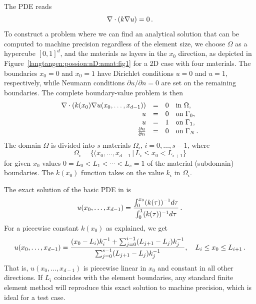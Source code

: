 The PDE reads
\begin{equation} \label{langtangen:poisson:2D:varcoeff2}
    \nabla\cdot (k\nabla u) =0 \thinspace .
\end{equation}
To construct a problem where we can find an analytical solution that can
be computed to machine precision regardless of the element size,
we choose $\Omega$ as a hypercube $[0,1]^d$, and the materials as
layers in the $x_0$ direction, as depicted in
Figure~\ref{langtangen:possion:nD:nmat:fig1} for a 2D case with four materials.
The boundaries $x_0=0$ and $x_0=1$ have Dirichlet conditions
$u=0$ and $u=1$, respectively, while Neumann conditions
$\partial u/\partial n=0$ are set on the remaining boundaries.
The complete boundary-value problem is then
\begin{equation} \label{langtangen:poisson:2D:varcoeff3}
  \begin{array}{rcll}
    \nabla\cdot \left(k(x_0)\nabla u(x_0,\ldots,x_{d-1})\right)
      &=& 0 &\mbox{in } \Omega, \\
    u &=& 0 &\mbox{on } \Gamma_0,\\
    u &=& 1 &\mbox{on } \Gamma_1,\\
    {\partial u\over\partial n} &=& 0 &\mbox{on } \Gamma_N\thinspace .
  \end{array}
\end{equation}
The domain $\Omega$ is divided into $s$ materials $\Omega_i$, $i=0,\ldots,s-1$,
where
\[ \Omega_i = \{ (x_0,\ldots,x_{d-1}\, |\, L_i \leq x_0 < L_{i+1}\} \]
for given $x_0$ values $0=L_0<L_1<\cdots< L_s=1$
of the material (subdomain) boundaries.
The $k(x_0)$ function takes on the value $k_i$ in $\Omega_i$.

The exact solution of the basic PDE in  is
\[ u(x_0,\ldots,x_{d-1}) =
{\int_0^{x_0} (k(\tau ))^{-1}d\tau\over \int_0^1 (k(\tau ))^{-1}d\tau}\thinspace .
\]
For a piecewise constant $k(x_0)$ as explained, we get
\begin{equation}
u(x_0,\ldots,x_{d-1}) =
{(x_0-L_i)k_i^{-1} + \sum_{j=0}^{i-1} (L_{j+1}-L_j)k_j^{-1}\over
\sum_{j=0}^{s-1} (L_{j+1}-L_j)k_j^{-1}},\quad L_i\leq x_0 \leq L_{i+1}\thinspace .
\label{langtangen:poisson:2D:varcoeff2:exact}
\end{equation}
That is, $u(x_0,\ldots,x_{d-1})$ is piecewise linear in $x_0$ and
constant in all other directions.
If $L_i$
coincides with the element boundaries, any standard finite element method
will reproduce this exact solution to machine precision, which is ideal
for a test case.

